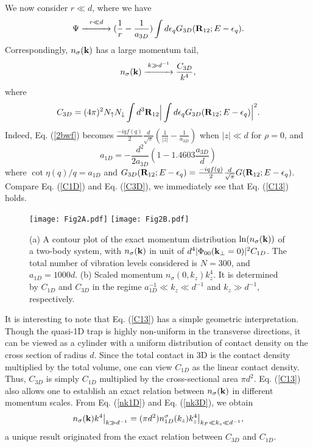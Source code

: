 \documentclass[twocolumn, prl]{revtex4}
\begin{document}
We now consider $r\ll d$, where we have
\begin{equation}
\Psi \stackrel{ r\ll d}{\xrightarrow{\hspace*{1cm}} }(\frac{1}{r}-\frac{1}{a_{3D}}) \int d\epsilon_q G_{3D}({\bf R}_{12};E-\epsilon_q) \label{Asym3D}.
\end{equation}
Correspondingly, $n_\sigma({\bf k})$ has a large momentum tail,
\begin{equation}
n_\sigma({\bf k})\stackrel{k\gg d^{-1}}{\xrightarrow{\hspace*{1cm}} }\frac{C_{3D}}{k^4},\label{nk3D}
\end{equation}
where 
\begin{equation}
C_{3D}=(4\pi)^2 N_{\uparrow}N_{\downarrow}\int d^3 {\bf R}_{12} \Big|\int d\epsilon_q G_{3D}({\bf R}_{12};E-\epsilon_q)\Big|^2.\label{C3D}
\end{equation}
Indeed, Eq. (\ref{2bwf}) becomes $\frac{-iqf(q)}{2}\frac{d}{\sqrt{\pi}}(\frac{1}{|z|}-\frac{1}{a_{3D}})$ when $|z| \ll d$ for $\rho=0$, and \cite{Olshanii1}
\begin{equation}
a_{1D}=-\frac{d^2}{2a_{3D}} \left( 1-1.4603 \frac{a_{3D}}{d} \right) \label{sl13}
\end{equation}
where $\cot{\eta(q)}/q=a_{1D}$ and $G_{3D}({\bf R}_{12};E-\epsilon_q)=\frac{-iqf(q)}{2}\frac{d}{\sqrt{\pi}} G({\bf R}_{12};E-\epsilon_q)$. Compare Eq. (\ref{C1D}) and Eq. (\ref{C3D}), we immediately see that Eq. (\ref{C13}) holds. 

\begin{figure}
	\centering
	{\texttt{[image: Fig2A.pdf]}}
	{\texttt{[image: Fig2B.pdf]}}
	\caption{(a) A contour plot of the exact momentum distribution $\ln(n_\sigma({\bf k}))$ of a two-body system, with $n_\sigma({\bf k})$ in unit of $d^4|\Phi_{00}({\bf k}_\bot=0)|^2 C_{1D}$. The total number of vibration levels considered is $N=300$, and $a_{1D}=1000d$. (b) Scaled momentum $n_\sigma(0,k_z)k_z^4$. It is determined by $C_{1D}$ and $C_{3D}$ in the regime $a_{1D}^{-1}\ll k_z\ll d^{-1}$ and $k_z\gg d^{-1}$, respectively. }\label{Fig2}
\end{figure}

It is interesting to note that Eq. (\ref{C13}) has a simple geometric interpretation. Though the quasi-1D trap is highly non-uniform in the transverse directions, it can be viewed as a cylinder with a uniform distribution of contact density on the cross section of radius $d$. Since the total contact in 3D is the contact density multiplied by the total volume, one can view  $C_{1D}$ as the linear contact density. Thus, $C_{3D}$ is simply $C_{1D}$ multiplied by the cross-sectional area $\pi d^2$. Eq. (\ref{C13}) also allows one to establish an exact relation between $n_\sigma({\bf k})$ in different momentum scales. From Eq. (\ref{nk1D}) and Eq. (\ref{nk3D}), we obtain
\begin{equation}
\begin{split}
n_\sigma({\bf k})k^4\big|_{k\gg d^{-1}}=(\pi d^2)n_{1D}^\sigma(k_z){k_z^4}\big|_{k_F\ll k_z\ll d^{-1}},
\end{split}
\end{equation}
a unique result originated from the exact relation between $C_{3D}$ and $C_{1D}$. 
\end{document}

